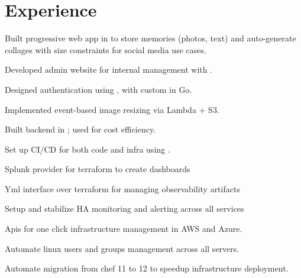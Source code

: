 \documentclass[]{deedy-resume-openfont}
\begin{document}
\hfill
\begin{minipage}[t]{0.66\textwidth}


\section{Experience}
\sectionsep

\vspace{\topsep} %
\begin{tightemize}
\item Built progressive web app in  to store memories (photos, text) and auto-generate collages with size constraints for social media use cases.
\item Developed admin website for internal management with .
\item Designed authentication using , with custom  in Go.
\item Implemented event-based image resizing via Lambda + S3.
\item Built backend in ; used  for cost efficiency.
\item Set up CI/CD for both code and infra using .
\end{tightemize}
\sectionsep
{}
\begin{tightemize}
\item Splunk provider for terraform to create dashboards
\item Yml interface over terraform for managing observability artifacts 
\end{tightemize}
\sectionsep

\begin{tightemize}
\item Setup and stabilize HA monitoring and alerting across all services 
\end{tightemize}
\sectionsep

\begin{tightemize}
\item Apis for one click infrastructure management in AWS and Azure.
\item Automate linux users and groups management across all servers.
\item Automate migration from chef 11 to 12 to speedup infrastructure deployment.
\end{tightemize}
\sectionsep


\end{minipage}
\end{document}
